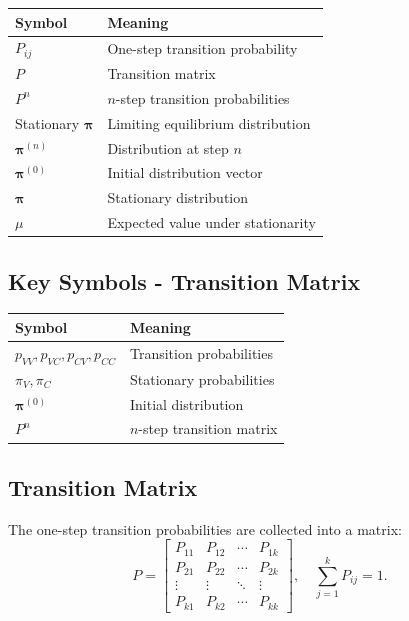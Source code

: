 \begin{center}
\begin{tabular}{ll}
\toprule
\textbf{Symbol} & \textbf{Meaning} \\
\midrule
$P_{ij}$ & One-step transition probability \\
$P$ & Transition matrix \\
$P^n$ & $n$-step transition probabilities \\
Stationary $\boldsymbol{\pi}$ & Limiting equilibrium distribution \\
$\boldsymbol{\pi}^{(n)}$ & Distribution at step $n$ \\
$\boldsymbol{\pi}^{(0)}$ & Initial distribution vector \\
$\boldsymbol{\pi}$ & Stationary distribution \\
$\mu$ & Expected value under stationarity \\
\bottomrule
\end{tabular}
\end{center}

\subsection{Key Symbols - Transition Matrix}

\begin{center}
\begin{tabular}{ll}
\toprule
\textbf{Symbol} & \textbf{Meaning} \\
\midrule
$p_{VV}, p_{VC}, p_{CV}, p_{CC}$ & Transition probabilities \\
$\pi_V, \pi_C$ & Stationary probabilities \\
$\boldsymbol{\pi}^{(0)}$ & Initial distribution \\
$P^n$ & $n$-step transition matrix \\
\bottomrule
\end{tabular}
\end{center}


\subsection{Transition Matrix}

The one-step transition probabilities are collected into a matrix:
\[
P =
\begin{bmatrix}
P_{11} & P_{12} & \cdots & P_{1k} \\
P_{21} & P_{22} & \cdots & P_{2k} \\
\vdots & \vdots & \ddots & \vdots \\
P_{k1} & P_{k2} & \cdots & P_{kk}
\end{bmatrix}, \quad
\sum_{j=1}^{k} P_{ij} = 1.
\]


